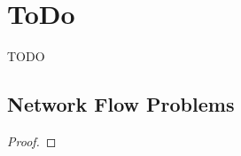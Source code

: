 \chapter{ToDo}

\begin{descr}
    TODO
\end{descr}

\section{Network Flow Problems}
\begin{example}

\end{example}

\begin{definition}

\end{definition}



\begin{example}

\end{example}




\begin{proof}

\end{proof}

\begin{lemma}

\end{lemma}
